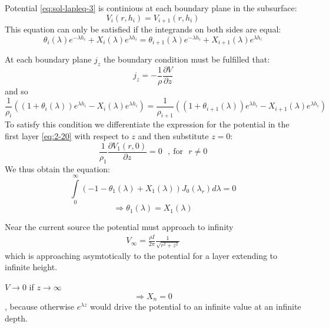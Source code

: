 \begin{compactenum}[A)]
\item Potential \eqref{eq:sol-lapleq-3} is continious at each boundary plane in the subsurface:
\begin{equation}
V_i(r,h_i)=V_{i+1}(r,h_i)
\end{equation}
This equation can only be satisfied if the integrands on both sides are equal:
\begin{equation}
\theta_i(\lambda)e^{-\lambda h_i}+X_i(\lambda)e^{\lambda h_i}=\theta_{i+1}(\lambda)e^{-\lambda h_i}+X_{i+1}(\lambda)e^{\lambda h_i} \label{eq:boundary-2-23A}
\end{equation}
\item At each boundary plane $j_z$ the boundary condition must be fulfilled that:
\begin{equation}
j_z=-\frac{1}{\rho}\frac{\partial V}{\partial z}
\end{equation} 
and so
\begin{equation}
\frac{1}{\rho_i}\left(\left(1+\theta_i(\lambda)\right)e^{\lambda h_i}-X_i(\lambda)e^{\lambda h_i}\right)=\frac{1}{\rho_{i+1}}\left(\left(1+\theta_{i+1}(\lambda)\right)e^{\lambda h_i}-X_{i+1}(\lambda)e^{\lambda h_i}\right) \label{eq:boundary-2-23B}
\end{equation}
To satisfy this condition we differentiate the expression for the potential in the first layer \eqref{eq:2-20} with respect to $z$ and then substitute $z=0$:
\begin{equation}
\frac{1}{\rho_1}\frac{\partial V_1(r,0)}{\partial z}=0 ~~~,~ \textrm{for~~} r\neq 0
\end{equation}
We thus obtain the equation:
\begin{equation}
\int\limits_{0}^{\infty}\left(-1-\theta_1(\lambda)+X_1(\lambda)\right) J_0(\lambda_r)d\lambda=0
\end{equation}
\begin{equation}
\Rightarrow \theta_1(\lambda)=X_1(\lambda) \label{eq:boundary-2-23C}
\end{equation}

\item Near the current source the potential must approach to infinity
\begin{align*}
V_\infty=\frac{\rho I}{2\pi}\frac{1}{\sqrt{r^2+z^2}}
\end{align*}
which is approaching asymtotically to the potential for a layer extending to infinite height.

\item $V\rightarrow 0$ if $z\rightarrow\infty$ 
\begin{equation}
\Rightarrow X_n=0 \label{eq:boundary-2-23D}
\end{equation}
, because otherwise $e^{\lambda z}$ would drive the potential to an infinite value at an infinite depth.

\end{compactenum}

